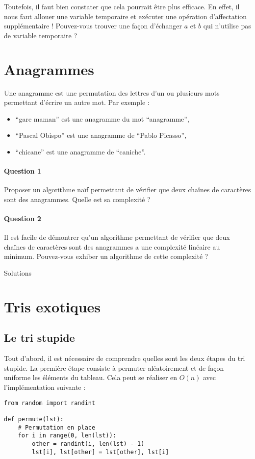 \documentclass{article}%
\begin{document}
Toutefois, il faut bien constater que cela pourrait être plus efficace. En effet, il nous faut allouer une variable temporaire et exécuter une opération d'affectation supplémentaire ! Pouvez-vous trouver une façon d'échanger $a$ et $b$ qui n'utilise pas de variable temporaire ?

\section{Anagrammes}

Une anagramme est une permutation des lettres d'un ou plusieurs mots permettant d'écrire un autre mot. Par exemple :
\begin{itemize}
	\item ``gare maman'' est une anagramme du mot ``anagramme'',
    \item ``Pascal Obispo'' est une anagramme de ``Pablo Picasso'',
    \item ``chicane'' est une anagramme de ``caniche''.
\end{itemize}

\paragraph{Question 1} Proposer un algorithme naïf permettant de vérifier que deux chaînes de caractères sont des anagrammes. Quelle est sa complexité ?

\paragraph{Question 2} Il est facile de démontrer qu'un algorithme permettant de vérifier que deux chaînes de caractères sont des anagrammes a une complexité linéaire au minimum. Pouvez-vous exhiber un algorithme de cette complexité ?

\newpage

\begin{center}
\LARGE Solutions
\end{center}
\setcounter{section}{0}
\section{Tris exotiques}

\subsection{Le tri stupide}

Tout d'abord, il est nécessaire de comprendre quelles sont les deux étapes du tri stupide. La première étape consiste à permuter aléatoirement et de façon uniforme les éléments du tableau. Cela peut se réaliser en $O(n)$ avec l'implémentation suivante :
\begin{verbatim}
from random import randint

def permute(lst):
    # Permutation en place
    for i in range(0, len(lst)):
        other = randint(i, len(lst) - 1)
        lst[i], lst[other] = lst[other], lst[i]
\end{verbatim}
\end{document}
